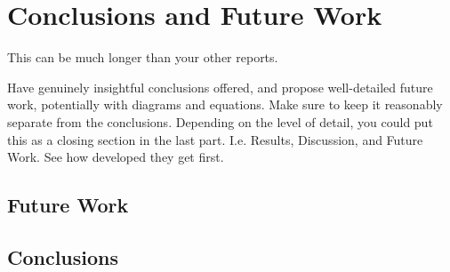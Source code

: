 \chapter{Conclusions and Future Work}

This can be much longer than your other reports.

Have genuinely insightful conclusions offered, and propose well-detailed future work, potentially with diagrams and equations. Make sure to keep it reasonably separate from the conclusions. Depending on the level of detail, you could put this as a closing section in the last part. I.e. Results, Discussion, and Future Work. See how developed they get first.

\section{Future Work}

\section{Conclusions}